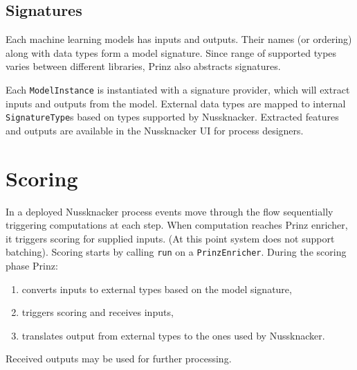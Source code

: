 \subsection{Signatures}

Each machine learning models has inputs and outputs.
Their names (or ordering) along with data types form a model signature.
Since range of supported types varies between different libraries, Prinz also abstracts signatures.

Each \texttt{ModelInstance} is instantiated with a signature provider, which will extract inputs and outputs from the model.
External data types are mapped to internal \texttt{SignatureType}s based on types supported by Nussknacker.
Extracted features and outputs are available in the Nussknacker UI for process designers.

\section{Scoring}

In a deployed Nussknacker process events move through the flow sequentially triggering computations at each step.
When computation reaches Prinz enricher, it triggers scoring for supplied inputs.
(At this point system does not support batching).
Scoring starts by calling \texttt{run} on a \texttt{PrinzEnricher}.
During the scoring phase Prinz:
\begin{enumerate}
	\item converts inputs to external types based on the model signature,
	\item triggers scoring and receives inputs,
	\item translates output from external types to the ones used by Nussknacker.
\end{enumerate}
Received outputs may be used for further processing.

